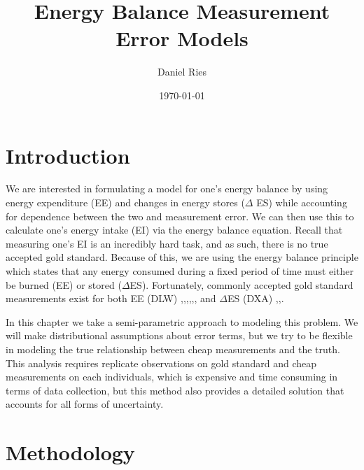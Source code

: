 \documentclass[11pt]{article}\usepackage[]{graphicx}\usepackage[]{color}
\begin{document}
\title{Energy Balance Measurement Error Models}
\author{Daniel Ries}
\date{\today}
\maketitle

\section{Introduction}

We are interested in formulating a model for one's energy balance by using energy expenditure (EE) and changes in energy stores ($\Delta$ ES) while accounting for dependence between the two and measurement error. We can then use this to calculate one's energy intake (EI) via the energy balance equation.   Recall that measuring one's EI is an incredibly hard task, and as such, there is no true accepted gold standard. Because of this, we are using the energy balance principle which states that any energy consumed during a fixed period of time must either be burned (EE) or stored ($\Delta$ES). Fortunately, commonly accepted gold standard measurements exist for both EE (DLW) \cite{lagerros},\cite{bouten},\cite{thomas11},\cite{hall11},\cite{gilmore},\cite{sanghvi15}, \cite{racette11} and $\Delta$ES (DXA) \cite{thomas11},\cite{sanghvi15},\cite{gilmore}. 

In this chapter we take a semi-parametric approach to modeling this problem. We will make distributional assumptions about error terms, but we try to be flexible in modeling the true relationship between cheap measurements and the truth. This analysis requires replicate observations on gold standard and cheap measurements on each individuals, which is expensive and time consuming in terms of data collection, but this method also provides a detailed solution that accounts for all forms of uncertainty.


\section{Methodology}
\end{document}
